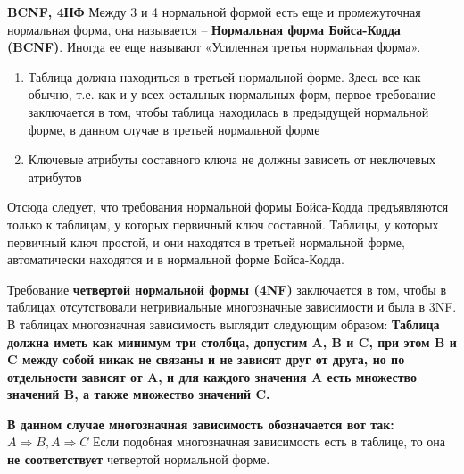 \bigbreak

\textbf{BCNF, 4НФ}
Между 3 и 4 нормальной формой есть еще и промежуточная нормальная форма, она называется – \textbf{Нормальная форма Бойса-Кодда (BCNF)}. Иногда ее еще называют «Усиленная третья нормальная форма».
\begin{enumerate}
    \item Таблица должна находиться в третьей нормальной форме. Здесь все как обычно, т.е. как и у всех остальных нормальных форм, первое требование заключается в том, чтобы таблица находилась в предыдущей нормальной форме, в данном случае в третьей нормальной форме
    \item Ключевые атрибуты составного ключа не должны зависеть от неключевых атрибутов
\end{enumerate}

Отсюда следует, что требования нормальной формы Бойса-Кодда предъявляются только к таблицам, у которых первичный ключ составной. Таблицы, у которых первичный ключ простой, и они находятся в третьей нормальной форме, автоматически находятся и в нормальной форме Бойса-Кодда.

Требование \textbf{четвертой нормальной формы (4NF)} заключается в том, чтобы в таблицах отсутствовали нетривиальные многозначные зависимости и была в 3NF.
В таблицах многозначная зависимость выглядит следующим образом:
\textbf{Таблица должна иметь как минимум три столбца, допустим A, B и C, при этом B и C между собой никак не связаны и не зависят друг от друга, но по отдельности зависят от A, и для каждого значения A есть множество значений B, а также множество значений C.}

\textbf{В данном случае многозначная зависимость обозначается вот так: $A \Rightarrow B, A \Rightarrow C$}
Если подобная многозначная зависимость есть в таблице, то она \textbf{не соответствует} четвертой нормальной форме.



